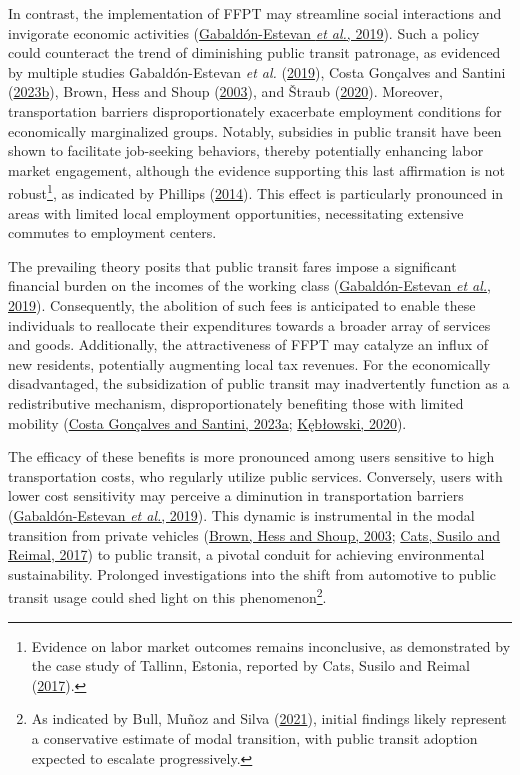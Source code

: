 \documentclass[12pt, a4paper, twoside]{article}
\numberwithin{equation}{subsection} %
\begin{document}
In contrast, the implementation of FFPT may streamline social
interactions and invigorate economic activities
(\protect\hyperlink{ref-Gabaldon_ffpt_2019}{Gabaldón-Estevan \emph{et
al.}, 2019}). Such a policy could counteract the trend of diminishing
public transit patronage, as evidenced by multiple studies
Gabaldón-Estevan \emph{et al.}
(\protect\hyperlink{ref-Gabaldon_ffpt_2019}{2019}), Costa Gonçalves and
Santini (\protect\hyperlink{ref-Gonuxe7alves_Santini_2023}{2023b}),
Brown, Hess and Shoup (\protect\hyperlink{ref-Brown_2003}{2003}), and
Štraub (\protect\hyperlink{ref-straub_2020}{2020}). Moreover,
transportation barriers disproportionately exacerbate employment
conditions for economically marginalized groups. Notably, subsidies in
public transit have been shown to facilitate job-seeking behaviors,
thereby potentially enhancing labor market engagement, although the
evidence supporting this last affirmation is not robust\footnote{Evidence
  on labor market outcomes remains inconclusive, as demonstrated by the
  case study of Tallinn, Estonia, reported by Cats, Susilo and Reimal
  (\protect\hyperlink{ref-cats_prospects_2017}{2017}).}, as indicated by
Phillips (\protect\hyperlink{ref-PHILLIPS2014}{2014}). This effect is
particularly pronounced in areas with limited local employment
opportunities, necessitating extensive commutes to employment centers.

The prevailing theory posits that public transit fares impose a
significant financial burden on the incomes of the working class
(\protect\hyperlink{ref-Gabaldon_ffpt_2019}{Gabaldón-Estevan \emph{et
al.}, 2019}). Consequently, the abolition of such fees is anticipated to
enable these individuals to reallocate their expenditures towards a
broader array of services and goods. Additionally, the attractiveness of
FFPT may catalyze an influx of new residents, potentially augmenting
local tax revenues. For the economically disadvantaged, the
subsidization of public transit may inadvertently function as a
redistributive mechanism, disproportionately benefiting those with
limited mobility
(\protect\hyperlink{ref-Costa_Gonuxe7alves_Santini_2023}{Costa Gonçalves
and Santini, 2023a};
\protect\hyperlink{ref-keblowski_why_2020}{Kębłowski, 2020}).

The efficacy of these benefits is more pronounced among users sensitive
to high transportation costs, who regularly utilize public services.
Conversely, users with lower cost sensitivity may perceive a diminution
in transportation barriers
(\protect\hyperlink{ref-Gabaldon_ffpt_2019}{Gabaldón-Estevan \emph{et
al.}, 2019}). This dynamic is instrumental in the modal transition from
private vehicles (\protect\hyperlink{ref-Brown_2003}{Brown, Hess and
Shoup, 2003}; \protect\hyperlink{ref-cats_prospects_2017}{Cats, Susilo
and Reimal, 2017}) to public transit, a pivotal conduit for achieving
environmental sustainability. Prolonged investigations into the shift
from automotive to public transit usage could shed light on this
phenomenon\footnote{As indicated by Bull, Muñoz and Silva
  (\protect\hyperlink{ref-BULL-RCT-2021}{2021}), initial findings likely
  represent a conservative estimate of modal transition, with public
  transit adoption expected to escalate progressively.}.
\end{document}
